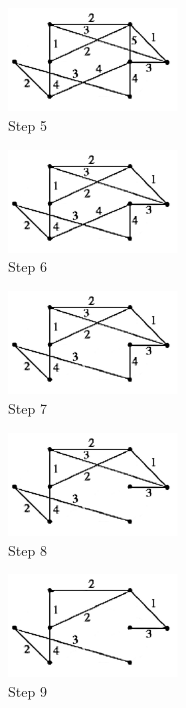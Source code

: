 \begin{figure}[H]
    \centering
    \includegraphics[width=0.4\textwidth]{./hw9_image/5.png}
    \caption{Step 5}
    \label{fig:Chapter4_Temporary_Pavilion_1}
\end{figure}
\begin{figure}[H]
    \centering    
    \includegraphics[width=0.4\textwidth]{./hw9_image/6.png}
    \caption{Step 6}    
    \label{fig:Chapter4_Temporary_Pavilion_1}
\end{figure}
\begin{figure}[H]
    \centering    
    \includegraphics[width=0.4\textwidth]{./hw9_image/7.png}
    \caption{Step 7}    
    \label{fig:Chapter4_Temporary_Pavilion_1}
\end{figure}
\begin{figure}[H]
    \centering    
    \includegraphics[width=0.4\textwidth]{./hw9_image/8.png}
    \caption{Step 8}    
    \label{fig:Chapter4_Temporary_Pavilion_1}
\end{figure}
\begin{figure}[H]
    \centering    
    \includegraphics[width=0.4\textwidth]{./hw9_image/9.png}
    \caption{Step 9}    
    \label{fig:Chapter4_Temporary_Pavilion_1}
\end{figure}
